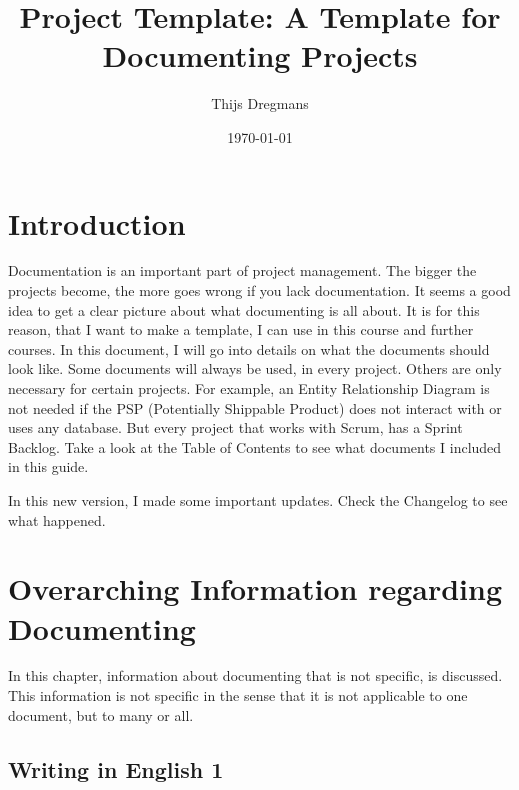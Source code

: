 \documentclass[10pt]{report}
\title{Project Template: A Template for Documenting Projects}
\date{\today}
\author{Thijs Dregmans}
\begin{document}
\maketitle

\chapter{Introduction}
\thispagestyle{fancy}

Documentation is an important part of project management. The bigger the projects become, the more goes wrong if you lack documentation. It seems a good idea to get a clear picture about what documenting is all about. It is for this reason, that I want to make a template, I can use in this course and further courses. In this document, I will go into details on what the documents should look like. Some documents will always be used, in every project. Others are only necessary for certain projects. For example, an Entity Relationship Diagram is not needed if the PSP (Potentially Shippable Product) does not interact with or uses any database. But every project that works with Scrum, has a Sprint Backlog. Take a look at the Table of Contents to see what documents I included in this guide.

In this new version, I made some important updates. Check the Changelog to see what happened.

\newpage

\tableofcontents

\newpage

\chapter{Overarching Information regarding Documenting}
\thispagestyle{fancy}

In this chapter, information about documenting that is not specific, is discussed. This information is not specific in the sense that it is not applicable to one document, but to many or all.

\medskip
\minitoc

\newpage

\section{Writing in English 1}
\end{document}

